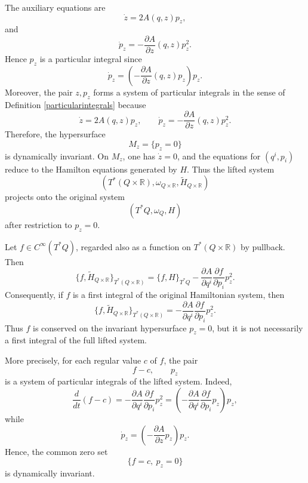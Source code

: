 \documentclass[10pt,a4paper]{article}
\begin{document}
The auxiliary equations are
\begin{equation*}
\dot z=2A(q,z)p_z,
\end{equation*}
and
\begin{equation*}
\dot p_z
=
-\frac{\partial A}{\partial z}(q,z)p_z^2.
\end{equation*}
Hence \(p_z\) is a particular integral since
\begin{equation*}
\dot p_z
=
\left(
-\frac{\partial A}{\partial z}(q,z)p_z
\right)p_z.
\end{equation*}
Moreover, the pair \(z,p_z\) forms a system of particular integrals in the sense of Definition \ref{particularintegrals} because
\[
\dot z=2A(q,z)p_z,
\qquad
\dot p_z=
-\frac{\partial A}{\partial z}(q,z)p_z^2.
\]
Therefore, the hypersurface
\[
M_z=\{p_z=0\}
\]
is dynamically invariant. On \(M_z\), one has \(\dot z=0\), and the equations for \((q^i,p_i)\) reduce to the Hamilton equations generated by \(H\). Thus the lifted system
\[
\left(T^*(Q\times\mathbb R),\omega_{Q\times\mathbb R},\widetilde H_{Q\times\mathbb R}\right)
\]
projects onto the original system
\[
(T^*Q,\omega_Q,H)
\]
after restriction to \(p_z=0\).

Let \(f\in C^\infty(T^*Q)\), regarded also as a function on \(T^*(Q\times\mathbb R)\) by pullback. Then
\begin{equation*}
\label{eq:scalarliftbracket}
\{f,\widetilde H_{Q\times\mathbb R}\}_{T^*(Q\times\mathbb R)}
=
\{f,H\}_{T^*Q}
-
\frac{\partial A}{\partial q^i}
\frac{\partial f}{\partial p_i}
p_z^2 .
\end{equation*}
Consequently, if \(f\) is a first integral of the original Hamiltonian system, then
\begin{equation*}
\{f,\widetilde H_{Q\times\mathbb R}\}_{T^*(Q\times\mathbb R)}
=
-
\frac{\partial A}{\partial q^i}
\frac{\partial f}{\partial p_i}
p_z^2 .
\end{equation*}
Thus \(f\) is conserved on the invariant hypersurface \(p_z=0\), but it is not necessarily a first integral of the full lifted system.

More precisely, for each regular value \(c\) of \(f\), the pair
\[
f-c,\qquad p_z
\]
is a system of particular integrals of the lifted system. Indeed,
\begin{equation*}
\frac{d}{dt}(f-c)
=
-
\frac{\partial A}{\partial q^i}
\frac{\partial f}{\partial p_i}
p_z^2
=
\left(
-
\frac{\partial A}{\partial q^i}
\frac{\partial f}{\partial p_i}
p_z
\right)p_z,
\end{equation*}
while
\[
\dot p_z
=
\left(
-\frac{\partial A}{\partial z}p_z
\right)p_z.
\]
Hence, the common zero set
\[
\{f=c,\ p_z=0\}
\]
is dynamically invariant.
\end{document}
